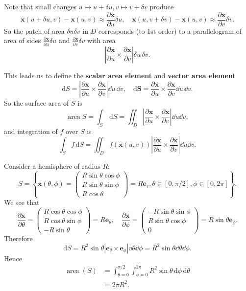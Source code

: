 Note that small changes $ u \mapsto u+\delta u,v \mapsto v+\delta v $ produce 
\[
    \mathbf{x}(u+\delta u,v)-\mathbf{x}(u,v) \approx \frac{\partial \mathbf{x}}{\partial u}\delta u ,\quad \mathbf{x}(u,v+\delta v)-\mathbf{x}(u,v) \approx \frac{\partial \mathbf{x}}{\partial v}\delta v.
\]
So the patch of area $ \delta u \delta v $ in $D$ corresponds (to 1st order) to a parallelogram of area of sides $ \frac{\partial \mathbf{x}}{\partial u}\delta u  $ and $ \frac{\partial \mathbf{x}}{\partial v}\delta v  $ with area 
\[
    \left| \frac{\partial \mathbf{x}}{\partial u}\times \frac{\partial \mathbf{x}}{\partial v} \right| \delta u \,\delta v.
\]

This leads us to define the \textbf{scalar area element} and \textbf{vector area element}
\[
    \mathrm{d} S = \left| \frac{\partial \mathbf{x}}{\partial u}\times \frac{\partial \mathbf{x}}{\partial v} \right| \dd u \,\dd v,\quad \mathrm{d} \mathbf{S} = \frac{\partial \mathbf{x}}{\partial u}\times \frac{\partial \mathbf{x}}{\partial v}  \dd u \,\dd v.
\]
So the surface area of $S$ is 
\[
    \operatorname{area} S = \int_{S} \,\mathrm{d}S = \iint_{D} \left| \frac{\partial \mathbf{x}}{\partial u}\times \frac{\partial \mathbf{x}}{\partial v} \right| \dd u \dd v,
\]
and integration of $f$ over $S$ is 
\[
    \int_{S} f \,\mathrm{d}S = \iint_{D} f(\mathbf{x}(u,v)) \left| \frac{\partial \mathbf{x}}{\partial u}\times \frac{\partial \mathbf{x}}{\partial v} \right| \dd u \dd v.
\]

\begin{example}
    Consider a hemisphere of radius $R$:
    \[
        S = \left\{ \mathbf{x}(\theta,\phi) = \begin{pmatrix}
           R \sin \theta \cos \phi \\ R\sin \theta \sin \phi \\ R\cos \theta
        \end{pmatrix}=R\mathbf{e}_r,\theta\in [0,\pi/2],\phi\in [0,2\pi]\right\}.
    \]
    We see that 
    \[
        \frac{\partial \mathbf{x}}{\partial \theta} =  \begin{pmatrix}
            R \cos \theta \cos \phi \\ R\cos \theta \sin \phi \\ -R\sin \theta
         \end{pmatrix}=R\mathbf{e}_\theta,\quad
        \frac{\partial \mathbf{x}}{\partial \phi}= \begin{pmatrix}
            -R \sin \theta \sin \phi \\ R\sin \theta \cos \phi \\ 0
         \end{pmatrix}=R \sin \theta \mathbf{e}_\phi.
    \]
    Therefore 
    \[
        \mathrm{d} S = R^2 \sin \theta |\mathbf{e}_\theta\times \mathbf{e}_\phi| \dd \theta\dd \phi = R^2 \sin \theta\dd \theta\dd \phi.
    \]
    Hence 
    \begin{align*}
        \operatorname{area}(S) &= \int_{\theta=0}^{\pi/2} \int_{\phi=0}^{2\pi} R^2 \sin \theta \,\mathrm{d}\phi  \,\mathrm{d}\theta\\ 
        &= 2\pi R^2.
    \end{align*}
\end{example}

